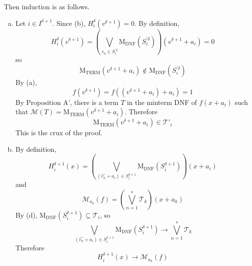 \documentclass[12pt,a4paper]{llncs}
\newcommand{\cM}{\mathcal{M}}
\newcommand{\cT}{\mathcal{T}}
\newcommand{\MDNF}{\mathrm{M}_\mathrm{DNF}}
\newcommand{\MTERM}{\mathrm{M}_\mathrm{TERM}}
\begin{document}
Then induction is as follows.
\begin{enumerate}[a.,start=3]

\item Let $i \in I^{\delta+1}$.
Since (b), $H_i^\delta (v^{\delta+1}) = 0$.
By definition,
\[
H_i^\delta (v^{\delta+1}) = 
(\bigvee_{v_n \in S_i^{'\delta}} \MDNF(S_i^{'\delta})) (v^{\delta+1} + a_i) = 0
\]
so
\[
\MTERM(v^{\delta+1} + a_i) \notin \MDNF(S_i^{'\delta})
\]
By (a),
\[
f(v^{\delta+1}) =
f((v^{\delta+1} + a_i) + a_i) = 1
\]
By Proposition A',
there is a term $T$ in the minterm DNF of
$f(x + a_i)$ such that
$\cM(T) = \MTERM(v^{\delta+1} + a_i)$.
Therefore
\[
\MTERM(v^{\delta+1} + a_i) \in \cT'_i
\]
This is the crux of the proof.
\addtocounter{enumi}{1}

\item By definition,
\[
H_i^{\delta+1} (x) =
(\bigvee_{(\widehat{v_n} + a_i) \in S_i^{\delta+1}}
\MDNF(S_i^{\delta+1}))
(x + a_i)
\]
and
\[
\cM_{a_k} ( f ) = (\bigvee_{n=1}^{s} \cT_k)(x + a_k)
\]
By (d), $\MDNF(S_i^{\delta+1}) \subseteq \cT_i$, so
\[
\bigvee_{(\widehat{v_n} + a_i) \in S_i^{\delta+1}}
\MDNF(S_i^{\delta+1}) \to
\bigvee_{n=1}^{s} \cT_k
\]
Therefore
\[
H_i^{\delta+1} (x) \to \cM_{a_k} ( f )
\]


\end{enumerate}












\end{document}
